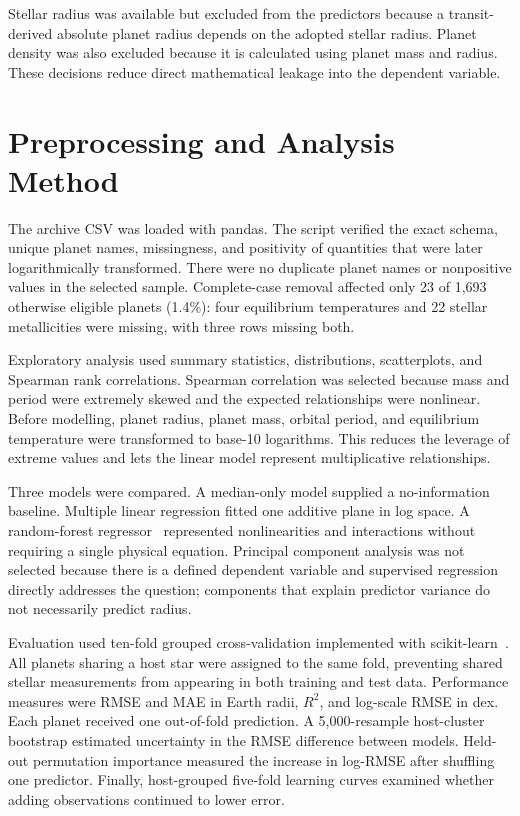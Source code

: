 \documentclass[11pt,a4paper]{article}
\begin{document}
Stellar radius was available but excluded from the predictors because a transit-derived absolute planet radius depends on the adopted stellar radius. Planet density was also excluded because it is calculated using planet mass and radius. These decisions reduce direct mathematical leakage into the dependent variable.

\section{Preprocessing and Analysis Method}

The archive CSV was loaded with pandas. The script verified the exact schema, unique planet names, missingness, and positivity of quantities that were later logarithmically transformed. There were no duplicate planet names or nonpositive values in the selected sample. Complete-case removal affected only 23 of 1,693 otherwise eligible planets (1.4\%): four equilibrium temperatures and 22 stellar metallicities were missing, with three rows missing both.

Exploratory analysis used summary statistics, distributions, scatterplots, and Spearman rank correlations. Spearman correlation was selected because mass and period were extremely skewed and the expected relationships were nonlinear. Before modelling, planet radius, planet mass, orbital period, and equilibrium temperature were transformed to base-10 logarithms. This reduces the leverage of extreme values and lets the linear model represent multiplicative relationships.

Three models were compared. A median-only model supplied a no-information baseline. Multiple linear regression fitted one additive plane in log space. A random-forest regressor~\cite{breiman2001random} represented nonlinearities and interactions without requiring a single physical equation. Principal component analysis was not selected because there is a defined dependent variable and supervised regression directly addresses the question; components that explain predictor variance do not necessarily predict radius.

Evaluation used ten-fold grouped cross-validation implemented with scikit-learn~\cite{pedregosa2011scikit}. All planets sharing a host star were assigned to the same fold, preventing shared stellar measurements from appearing in both training and test data. Performance measures were RMSE and MAE in Earth radii, $R^2$, and log-scale RMSE in dex. Each planet received one out-of-fold prediction. A 5,000-resample host-cluster bootstrap estimated uncertainty in the RMSE difference between models. Held-out permutation importance measured the increase in log-RMSE after shuffling one predictor. Finally, host-grouped five-fold learning curves examined whether adding observations continued to lower error.
\end{document}

